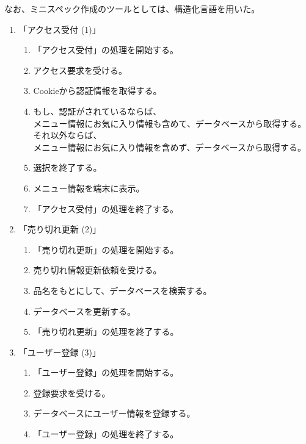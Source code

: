 \documentclass[a4paper]{jsarticle}
\begin{document}
なお、ミニスペック作成のツールとしては、構造化言語を用いた。

\begin{enumerate}
  \item 「アクセス受付 (1)」
  \begin{enumerate}
    \item 「アクセス受付」の処理を開始する。
    \item アクセス要求を受ける。
    \item Cookieから認証情報を取得する。
    \item もし、認証がされているならば、\\
    \hspace{0.5cm} メニュー情報にお気に入り情報も含めて、データベースから取得する。\\
    それ以外ならば、\\
    \hspace{0.5cm} メニュー情報にお気に入り情報を含めず、データベースから取得する。
    \item 選択を終了する。
    \item メニュー情報を端末に表示。
    \item 「アクセス受付」の処理を終了する。
  \end{enumerate}
\item 「売り切れ更新 (2)」
  \begin{enumerate}
    \item 「売り切れ更新」の処理を開始する。
    \item 売り切れ情報更新依頼を受ける。
    \item 品名をもとにして、データベースを検索する。
    \item データベースを更新する。
    \item 「売り切れ更新」の処理を終了する。
  \end{enumerate}
\item 「ユーザー登録 (3)」
  \begin{enumerate}
    \item 「ユーザー登録」の処理を開始する。
    \item 登録要求を受ける。
    \item データベースにユーザー情報を登録する。
    \item 「ユーザー登録」の処理を終了する。
  \end{enumerate}

\newpage


\end{enumerate}
\end{document}

